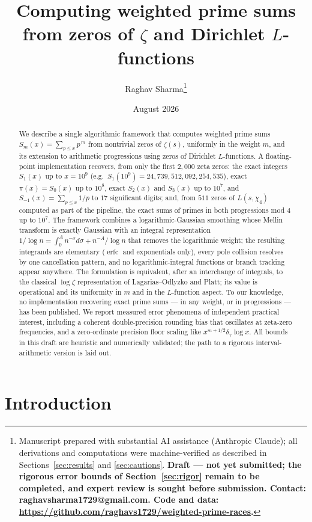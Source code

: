 \documentclass[11pt]{article}
\title{Computing weighted prime sums from zeros of $\zeta$ and Dirichlet
$L$-functions}
\author{Raghav Sharma\thanks{Manuscript prepared with substantial AI assistance
(Anthropic Claude); all derivations and computations were machine-verified as
described in Sections~\ref{sec:results} and \ref{sec:cautions}.
\textbf{Draft --- not yet submitted; the rigorous error bounds of
Section~\ref{sec:rigor} remain to be completed, and expert review is sought
before submission. Contact: raghavsharma1729@gmail.com. Code and data:
\url{https://github.com/raghavs1729/weighted-prime-races}.}}}
\date{August 2026}
\newcommand{\erfc}{\operatorname{erfc}}
\begin{document}
\maketitle

\begin{abstract}
We describe a single algorithmic framework that computes weighted prime sums
$S_m(x)=\sum_{p\le x}p^{\,m}$ from nontrivial zeros of $\zeta(s)$, uniformly
in the weight $m$, and its extension to arithmetic progressions using zeros
of Dirichlet $L$-functions. A floating-point implementation recovers, from
only the first $2{,}000$ zeta zeros: the exact integers $S_1(x)$ up to
$x=10^9$ (e.g.\ $S_1(10^9)=24{,}739{,}512{,}092{,}254{,}535$), exact
$\pi(x)=S_0(x)$ up to $10^8$, exact $S_2(x)$ and $S_3(x)$ up to $10^7$, and
$S_{-1}(x)=\sum_{p\le x}1/p$ to $17$ significant digits; and, from $511$
zeros of $L(s,\chi_4)$ computed as part of the pipeline, the exact sums of
primes in both progressions mod $4$ up to $10^7$. The framework combines a
logarithmic-Gaussian smoothing whose Mellin transform is exactly Gaussian
with an integral representation
$1/\log n=\int_0^A n^{-\sigma}d\sigma+n^{-A}/\log n$ that removes the
logarithmic weight; the resulting integrands are elementary ($\erfc$ and
exponentials only), every pole collision resolves by one cancellation
pattern, and no logarithmic-integral functions or branch tracking appear
anywhere. The formulation is equivalent, after an interchange of integrals,
to the classical $\log\zeta$ representation of Lagarias--Odlyzko and Platt;
its value is operational and its uniformity in $m$ and in the $L$-function
aspect. To our knowledge, no implementation recovering exact prime sums ---
in any weight, or in progressions --- has been published. We report measured
error phenomena of independent practical interest, including a coherent
double-precision rounding bias that oscillates at zeta-zero frequencies, and
a zero-ordinate precision floor scaling like $x^{m+1/2}\delta_\gamma\log x$.
All bounds in this draft are heuristic and numerically validated; the path
to a rigorous interval-arithmetic version is laid out.
\end{abstract}

\section{Introduction}\label{sec:intro}
\end{document}
